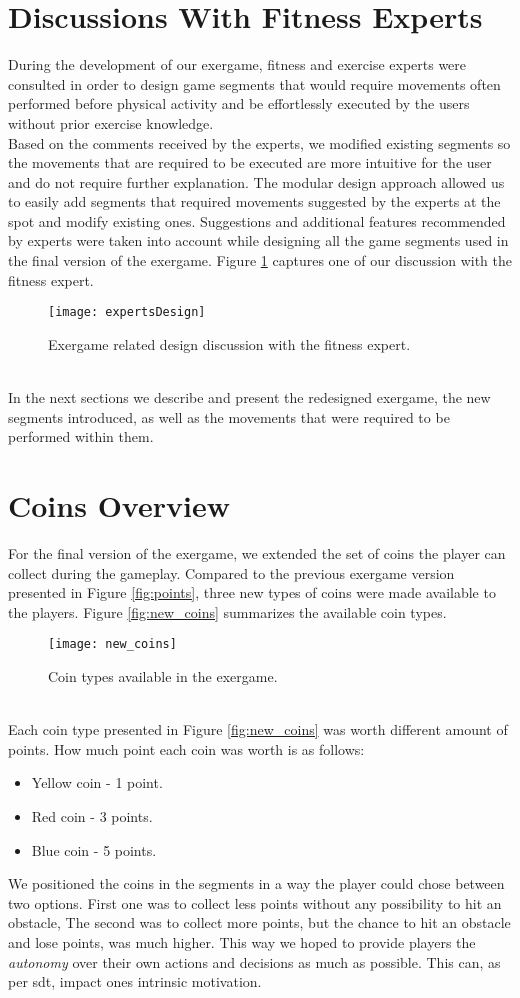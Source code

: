 \section{Discussions With Fitness Experts}
During the development of our exergame, fitness and exercise experts were consulted in order to design game segments that would require movements often performed before physical activity and be effortlessly executed by the users without prior exercise knowledge. \\Based on the comments received by the experts, we modified existing segments so the movements that are required to be executed are more intuitive for the user and do not require further explanation. The modular design approach allowed us to easily add segments that required movements suggested by the experts at the spot and modify existing ones. Suggestions and additional features recommended by experts were taken into account while designing all the game segments used in the final version of the exergame.  Figure \ref{fig:expDesign} captures one of our discussion with the fitness expert.\\  
 \begin{figure}[h]
    \centering
    \texttt{[image: expertsDesign]}
    \caption{Exergame related design discussion with the fitness expert.}
    \label{fig:expDesign}
\end{figure}\\
In the next sections we describe and present the redesigned exergame, the new segments introduced, as well as the movements that were required to be performed within them.\pagebreak
\section{Coins Overview}
For the final version of the exergame, we extended the set of coins the player can collect during the gameplay. Compared to the previous exergame version presented in Figure \ref{fig:points}, three new types of coins were made available to the players. Figure \ref{fig:new_coins} summarizes the available coin types.  
\begin{figure}[h]
    \centering
    \texttt{[image: new\_coins]}
    \caption{Coin types available in the exergame.}
    \label{fig:start}
\end{figure}\\
Each coin type presented in Figure \ref{fig:new_coins}  was worth different amount of points. How much point each coin was worth is as follows:
\begin{itemize}
\item Yellow coin - 1 point.
\item Red coin - 3 points.
\item Blue coin - 5 points.
\end{itemize}
We positioned the coins in the segments in a way the player could chose between two options. First one was to collect less points without any possibility to hit an obstacle, The second was to collect more points, but the chance to hit an obstacle and lose points, was much higher. This way we hoped to provide players the \textit{autonomy} over their own actions and decisions as much as possible. This can, as per \acrshort{sdt}, impact ones intrinsic motivation. 
